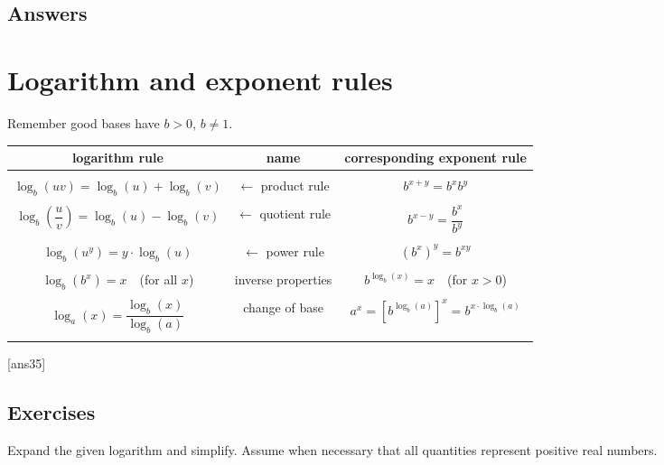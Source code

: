 \documentclass{amsbook}
\numberwithin{section}{chapter}
\numberwithin{equation}{chapter}
\begin{document}
\subsection*{Answers \nopunct} \hfill
\begin{multicols}{2}
	
\end{multicols}

\newpage
\section{Logarithm and exponent rules}

Remember good bases have $b>0$, $b\neq 1$.

\bigskip
\begin{tabular}{|c | c | c|}
	\hline
	\textbf{logarithm rule} & \textbf{name} & \textbf{corresponding exponent rule} \\
	\hline
	& & \\
	$\log_b(uv) = \log_b(u) + \log_b(v)$ & $\leftarrow$ product rule & $b^{x+y} = b^xb^y$ \\
	& & \\
	$\log_b\left(\dfrac{u}{v}\right) = \log_b(u) - \log_b(v)$ & $\leftarrow$  quotient rule & $b^{x-y} = \dfrac{b^x}{b^y}$ \\
	& & \\
	$ \log_b\left( u^y \right) =  y\cdot\log_b\left(u\right) $ & $\leftarrow$  power rule & $ \left(b^x\right)^y = b^{xy}$ \\
	& &\\
	$ \log_b\left( b^x \right) = x$\ \  (for all $x$) & inverse properties & $ b^{\log_b(x)} = x$\ \ (for $x>0$) \\		
	& &\\
	$ \log_a(x) = \dfrac{\log_b(x)}{\log_b(a)}$ & change of base & $ a^x = \left[ b^{\log_b(a)} \right]^x = b^{x\cdot \log_b(a)}$ \\	
		& &\\	
	\hline
\end{tabular}

[ans35]
\subsection*{Exercises \nopunct} \hfill

Expand the given logarithm and simplify.  Assume when necessary that all quantities represent positive real numbers.
\end{document}
